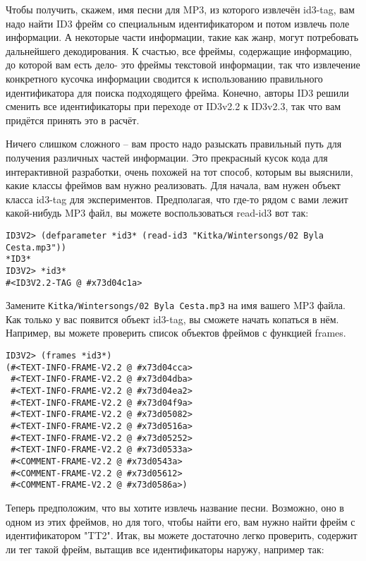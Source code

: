 Чтобы получить, скажем, имя песни для MP3, из которого извлечён id3-tag, вам надо найти
ID3 фрейм со специальным идентификатором и потом извлечь поле информации. А некоторые
части информации, такие как жанр, могут потребовать дальнейшего декодирования. К счастью,
все фреймы, содержащие информацию, до которой вам есть дело- это фреймы текстовой
информации, так что извлечение конкретного кусочка информации сводится к использованию
правильного идентификатора для поиска подходящего фрейма. Конечно, авторы ID3 решили
сменить все идентификаторы при переходе от ID3v2.2 к ID3v2.3, так что вам придётся принять
это в расчёт.

Ничего слишком сложного -- вам просто надо разыскать правильный путь для получения
различных частей информации. Это прекрасный кусок кода для интерактивной разработки, очень
похожей на тот способ, которым вы выяснили, какие классы фреймов вам нужно
реализовать. Для начала, вам нужен объект класса id3-tag для экспериментов. Предполагая,
что где-то рядом с вами лежит какой-нибудь MP3 файл, вы можете воспользоваться read-id3
вот так:

\begin{lstlisting}
ID3V2> (defparameter *id3* (read-id3 "Kitka/Wintersongs/02 Byla Cesta.mp3"))
*ID3*
ID3V2> *id3*
#<ID3V2.2-TAG @ #x73d04c1a>
\end{lstlisting}

Замените \texttt{Kitka/Wintersongs/02 Byla Cesta.mp3} на имя вашего MP3 файла. Как только
у вас появится объект id3-tag, вы сможете начать копаться в нём. Например, вы можете
проверить список объектов фреймов с функцией frames.

\begin{lstlisting}
ID3V2> (frames *id3*)
(#<TEXT-INFO-FRAME-V2.2 @ #x73d04cca>
 #<TEXT-INFO-FRAME-V2.2 @ #x73d04dba>
 #<TEXT-INFO-FRAME-V2.2 @ #x73d04ea2>
 #<TEXT-INFO-FRAME-V2.2 @ #x73d04f9a>
 #<TEXT-INFO-FRAME-V2.2 @ #x73d05082>
 #<TEXT-INFO-FRAME-V2.2 @ #x73d0516a>
 #<TEXT-INFO-FRAME-V2.2 @ #x73d05252>
 #<TEXT-INFO-FRAME-V2.2 @ #x73d0533a>
 #<COMMENT-FRAME-V2.2 @ #x73d0543a>
 #<COMMENT-FRAME-V2.2 @ #x73d05612>
 #<COMMENT-FRAME-V2.2 @ #x73d0586a>)
\end{lstlisting}

Теперь предположим, что вы хотите извлечь название песни. Возможно, оно в одном из этих
фреймов, но для того, чтобы найти его, вам нужно найти фрейм с идентификатором
"TT2". Итак, вы можете достаточно легко проверить, содержит ли тег такой фрейм, вытащив
все идентификаторы наружу, например так:

